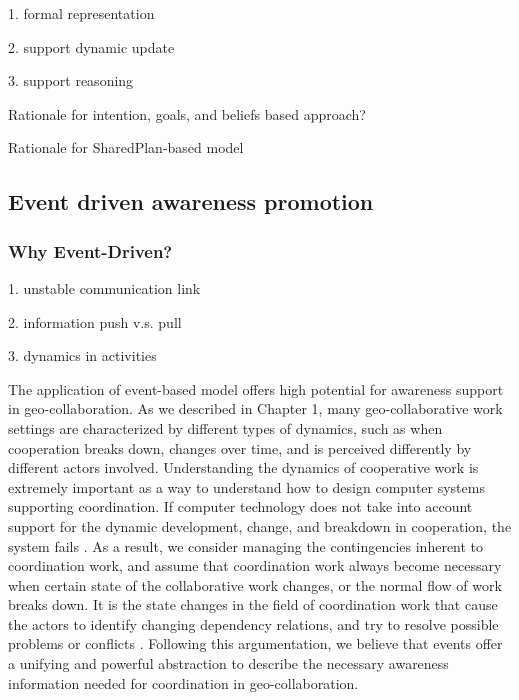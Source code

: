 1. formal representation

2. support dynamic update

3. support reasoning

Rationale for intention, goals, and beliefs based approach?

Rationale for SharedPlan-based model

\subsection{Event driven awareness promotion} %
\label{sub:event_driven_awareness_promotion}

\subsubsection{Why Event-Driven?} %
\label{ssub:why_event_driven_}

1. unstable communication link

2. information push v.s. pull

3. dynamics in activities

The application of event-based model offers high potential for awareness support in geo-collaboration. As we described in Chapter 1, many geo-collaborative work settings are characterized by different types of dynamics, such as when cooperation breaks down, changes over time, and is perceived differently by different actors involved. Understanding the dynamics of cooperative work is extremely important as a way to understand how to design computer systems supporting coordination. If computer technology does not take into account support for the dynamic development, change, and breakdown in cooperation, the system fails \cite{bardram1998designing}. As a result, we consider managing the contingencies inherent to coordination work, and assume that coordination work always become necessary when certain state of the collaborative work changes, or the normal flow of work breaks down. It is the state changes in the field of coordination work that cause the actors to identify changing dependency relations, and try to resolve possible problems or conflicts \cite{symon1996coordination}. Following this argumentation, we believe that events offer a unifying and powerful abstraction to describe the necessary awareness information needed for coordination in geo-collaboration. 


